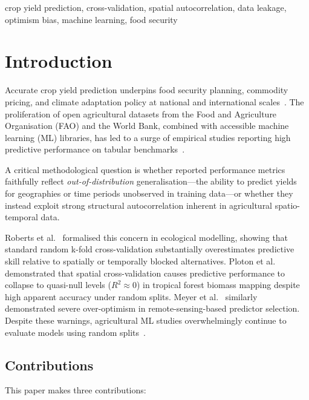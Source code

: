 \documentclass[conference]{IEEEtran}
\begin{document}
\begin{IEEEkeywords}
crop yield prediction, cross-validation, spatial autocorrelation, 
data leakage, optimism bias, machine learning, food security
\end{IEEEkeywords}

\section{Introduction}
\label{sec:intro}

Accurate crop yield prediction underpins food security planning, commodity 
pricing, and climate adaptation policy at national and international 
scales~\cite{lobell2010,lobell2011}. The proliferation of open agricultural 
datasets from the Food and Agriculture Organisation (FAO) and the World Bank, 
combined with accessible machine learning (ML) libraries, has led to a surge 
of empirical studies reporting high predictive performance on tabular 
benchmarks~\cite{vanklompenburg2020}.

A critical methodological question is whether reported performance metrics 
faithfully reflect \emph{out-of-distribution} generalisation---the ability to 
predict yields for geographies or time periods unobserved in training data---or 
whether they instead exploit strong structural autocorrelation inherent in 
agricultural spatio-temporal data.

Roberts et al.~\cite{roberts2017cross} formalised this concern in ecological 
modelling, showing that standard random k-fold cross-validation substantially 
overestimates predictive skill relative to spatially or temporally blocked 
alternatives. Ploton et al.~\cite{ploton2020} demonstrated that spatial 
cross-validation causes predictive performance to collapse to quasi-null levels 
($R^2 \approx 0$) in tropical forest biomass mapping despite high apparent 
accuracy under random splits. Meyer et al.~\cite{meyer2019} similarly 
demonstrated severe over-optimism in remote-sensing-based predictor selection. 
Despite these warnings, agricultural ML studies overwhelmingly continue to 
evaluate models using random splits~\cite{vanklompenburg2020}.

\subsection{Contributions}

This paper makes three contributions:
\end{document}
